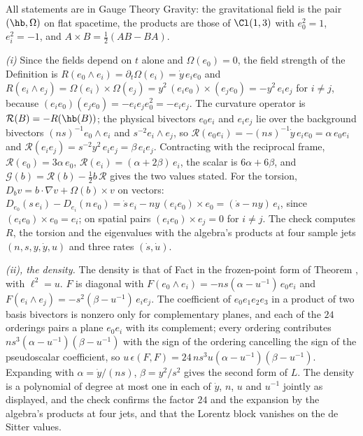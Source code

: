 All statements are in Gauge Theory Gravity: the gravitational field is the pair $(\hb, \Omega)$ on flat spacetime, the products are those of $\Cl(1,3)$ with $e_{0}^{2} = 1$, $e_{i}^{2} = -1$, and $A \times B = \tfrac12(AB - BA)$.

\emph{(i)} Since the fields depend on $t$ alone and $\Omega(e_{0}) = 0$, the field strength of the Definition is $R(e_{0} \wedge e_{i}) = \partial_{t}\Omega(e_{i}) = \dot y\,e_{i}e_{0}$ and $R(e_{i} \wedge e_{j}) = \Omega(e_{i}) \times \Omega(e_{j}) = y^{2}\,(e_{i}e_{0}) \times (e_{j}e_{0}) = -y^{2}\,e_{i}e_{j}$ for $i \neq j$, because $(e_{i}e_{0})(e_{j}e_{0}) = -e_{i}e_{j}e_{0}^{2} = -e_{i}e_{j}$. The curvature operator is $\mathcal{R}(B) = -R(\hb(B))$; the physical bivectors $e_{0}e_{i}$ and $e_{i}e_{j}$ lie over the background bivectors $(ns)^{-1}e_{0} \wedge e_{i}$ and $s^{-2}e_{i} \wedge e_{j}$, so $\mathcal{R}(e_{0}e_{i}) = -(ns)^{-1}\dot y\,e_{i}e_{0} = \alpha\,e_{0}e_{i}$ and $\mathcal{R}(e_{i}e_{j}) = s^{-2}y^{2}\,e_{i}e_{j} = \beta\,e_{i}e_{j}$. Contracting with the reciprocal frame, $\mathcal{R}(e_{0}) = 3\alpha\,e_{0}$, $\mathcal{R}(e_{i}) = (\alpha + 2\beta)\,e_{i}$, the scalar is $6\alpha + 6\beta$, and $\mathcal{G}(b) = \mathcal{R}(b) - \tfrac12 b\,\mathcal{R}$ gives the two values stated. For the torsion, $D_{b}v = b \cdot \nabla v + \Omega(b) \times v$ on vectors: $D_{e_{0}}(s\,e_{i}) - D_{e_{i}}(n\,e_{0}) = \dot s\,e_{i} - n y\,(e_{i}e_{0}) \times e_{0} = (\dot s - n y)\,e_{i}$, since $(e_{i}e_{0}) \times e_{0} = e_{i}$; on spatial pairs $(e_{i}e_{0}) \times e_{j} = 0$ for $i \neq j$. The check computes $R$, the torsion and the eigenvalues with the algebra's products at four sample jets $(n, s, y, \dot y, u)$ and three rates $(\dot s, \dot u)$.

\emph{(ii), the density.} The density is that of Fact  in the frozen-point form of Theorem , with $\ell^{2} = u$. $F$ is diagonal with $F(e_{0} \wedge e_{i}) = -ns(\alpha - u^{-1})\,e_{0}e_{i}$ and $F(e_{i} \wedge e_{j}) = -s^{2}(\beta - u^{-1})\,e_{i}e_{j}$. The coefficient of $e_{0}e_{1}e_{2}e_{3}$ in a product of two basis bivectors is nonzero only for complementary planes, and each of the $24$ orderings pairs a plane $e_{0}e_{i}$ with its complement; every ordering contributes $n s^{3}(\alpha - u^{-1})(\beta - u^{-1})$ with the sign of the ordering cancelling the sign of the pseudoscalar coefficient, so $u\,\epsilon(F, F) = 24\,n s^{3}u(\alpha - u^{-1})(\beta - u^{-1})$. Expanding with $\alpha = \dot y/(ns)$, $\beta = y^{2}/s^{2}$ gives the second form of $L$. The density is a polynomial of degree at most one in each of $\dot y$, $n$, $u$ and $u^{-1}$ jointly as displayed, and the check confirms the factor $24$ and the expansion by the algebra's products at four jets, and that the Lorentz block vanishes on the de Sitter values.

